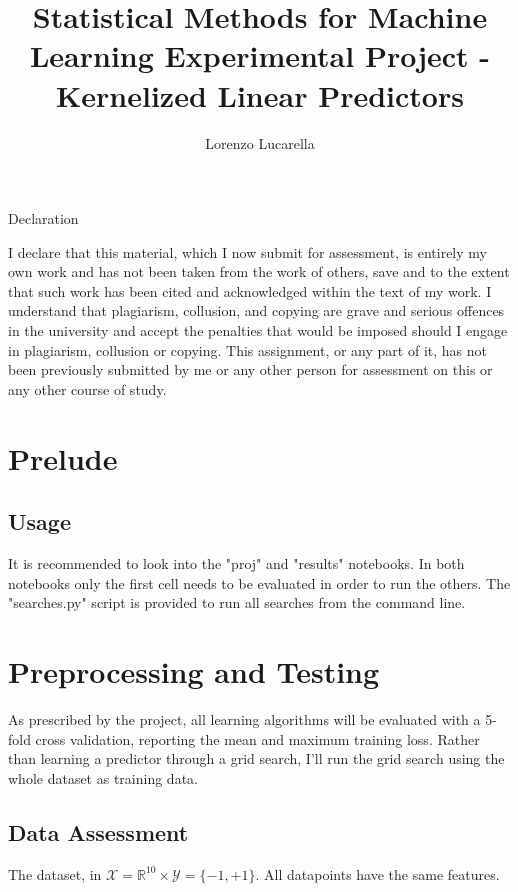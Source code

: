 \makeindex
\title{Statistical Methods for Machine Learning Experimental Project - Kernelized Linear Predictors}
\author{Lorenzo Lucarella}


\setlength{\parskip}{\baselineskip} 
\AddToShipoutPicture*{\BackgroundPic}

\maketitle{}
\pagebreak{}
\tableofcontents{}
\noindent{}

\pagebreak{}

Declaration

I declare that this material, which I now submit for assessment, is entirely my own work and has not been taken from the work of others, save and to the extent that such work has been cited and acknowledged within the text of my work. I understand that plagiarism, collusion, and copying are grave and serious offences in the university and accept the penalties that would be imposed should I engage in plagiarism, collusion or copying. This assignment, or any part of it, has not been previously submitted by me or any other person for assessment on this or any other course of study.

\section{Prelude}

\subsection{Usage}
It is recommended to look into the "proj" and "results" notebooks. In both notebooks only the first cell needs to be evaluated in order to run the others. The "searches.py" script is provided to run all searches from the command line.

\section{Preprocessing and Testing}
As prescribed by the project, all learning algorithms will be evaluated with a 5-fold cross validation, reporting the mean and maximum training loss. Rather than learning a predictor through a grid search, I'll run the grid search using the whole dataset as training data.

\subsection{Data Assessment}
The dataset, in $\mathcal{X} = \mathbb{R}^10 \times{} \mathcal{Y} = \{-1, +1\}$. All datapoints have the same features. 

